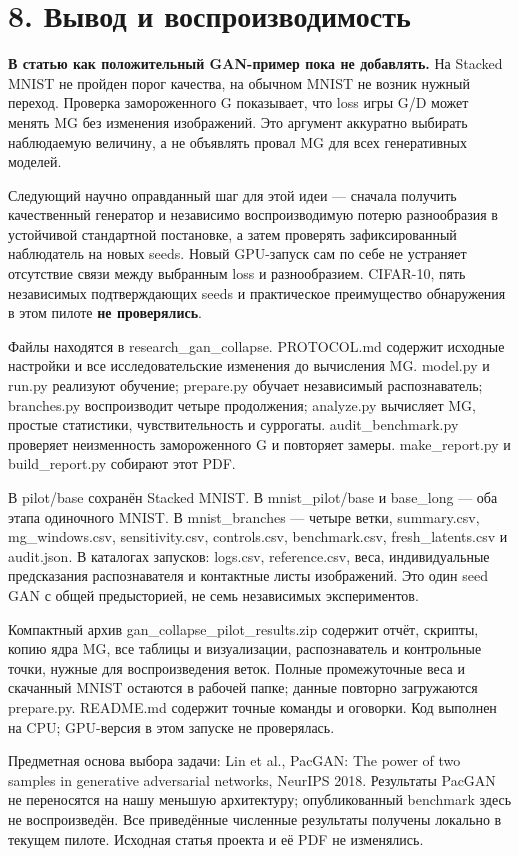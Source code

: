 \documentclass[10pt,a4paper]{article}
\begin{document}
\newpage

\section*{8. Вывод и воспроизводимость}

\textbf{В статью как положительный GAN-пример пока не добавлять.} На Stacked MNIST не пройден порог качества, на обычном MNIST не возник нужный переход. Проверка замороженного G показывает, что loss игры G/D может менять MG без изменения изображений. Это аргумент аккуратно выбирать наблюдаемую величину, а не объявлять провал MG для всех генеративных моделей.

Следующий научно оправданный шаг для этой идеи --- сначала получить качественный генератор и независимо воспроизводимую потерю разнообразия в устойчивой стандартной постановке, а затем проверять зафиксированный наблюдатель на новых seeds. Новый GPU-запуск сам по себе не устраняет отсутствие связи между выбранным loss и разнообразием. CIFAR-10, пять независимых подтверждающих seeds и практическое преимущество обнаружения в этом пилоте \textbf{не проверялись}.

Файлы находятся в research\_gan\_collapse. PROTOCOL.md содержит исходные настройки и все исследовательские изменения до вычисления MG. model.py и run.py реализуют обучение; prepare.py обучает независимый распознаватель; branches.py воспроизводит четыре продолжения; analyze.py вычисляет MG, простые статистики, чувствительность и суррогаты. audit\_benchmark.py проверяет неизменность замороженного G и повторяет замеры. make\_report.py и build\_report.py собирают этот PDF.

В pilot/base сохранён Stacked MNIST. В mnist\_pilot/base и base\_long --- оба этапа одиночного MNIST. В mnist\_branches --- четыре ветки, summary.csv, mg\_windows.csv, sensitivity.csv, controls.csv, benchmark.csv, fresh\_latents.csv и audit.json. В каталогах запусков: logs.csv, reference.csv, веса, индивидуальные предсказания распознавателя и контактные листы изображений. Это один seed GAN с общей предысторией, не семь независимых экспериментов.

Компактный архив gan\_collapse\_pilot\_results.zip содержит отчёт, скрипты, копию ядра MG, все таблицы и визуализации, распознаватель и контрольные точки, нужные для воспроизведения веток. Полные промежуточные веса и скачанный MNIST остаются в рабочей папке; данные повторно загружаются prepare.py. README.md содержит точные команды и оговорки. Код выполнен на CPU; GPU-версия в этом запуске не проверялась.

Предметная основа выбора задачи: Lin et al., PacGAN: The power of two samples in generative adversarial networks, NeurIPS 2018. Результаты PacGAN не переносятся на нашу меньшую архитектуру; опубликованный benchmark здесь не воспроизведён. Все приведённые численные результаты получены локально в текущем пилоте. Исходная статья проекта и её PDF не изменялись.
\end{document}
